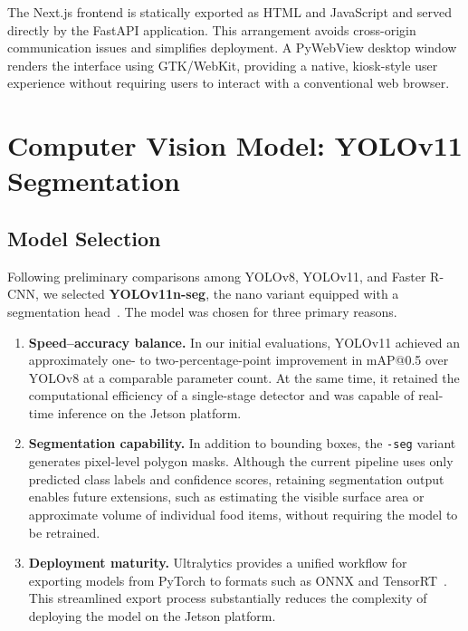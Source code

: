 \documentclass[11pt,a4paper]{article}
\begin{document}
The Next.js frontend is statically exported as HTML and JavaScript and served directly by the FastAPI application. This arrangement avoids cross-origin communication issues and simplifies deployment. A PyWebView desktop window renders the interface using GTK/WebKit, providing a native, kiosk-style user experience without requiring users to interact with a conventional web browser.

\section{Computer Vision Model: YOLOv11 Segmentation}

\subsection{Model Selection}

Following preliminary comparisons among YOLOv8, YOLOv11, and Faster R-CNN, we selected \textbf{YOLOv11n-seg}, the nano variant equipped with a segmentation head~\cite{ultralytics}. The model was chosen for three primary reasons.

\begin{enumerate}
  \item \textbf{Speed--accuracy balance.} In our initial evaluations, YOLOv11 achieved an approximately one- to two-percentage-point improvement in mAP@0.5 over YOLOv8 at a comparable parameter count. At the same time, it retained the computational efficiency of a single-stage detector and was capable of real-time inference on the Jetson platform.
  \item \textbf{Segmentation capability.} In addition to bounding boxes, the \texttt{-seg} variant generates pixel-level polygon masks. Although the current pipeline uses only predicted class labels and confidence scores, retaining segmentation output enables future extensions, such as estimating the visible surface area or approximate volume of individual food items, without requiring the model to be retrained.
  \item \textbf{Deployment maturity.} Ultralytics provides a unified workflow for exporting models from PyTorch to formats such as ONNX and TensorRT~\cite{ultralytics}. This streamlined export process substantially reduces the complexity of deploying the model on the Jetson platform.
\end{enumerate}
\end{document}
